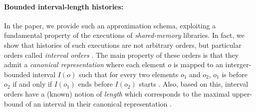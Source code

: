  

\paragraph{Bounded interval-length histories:} In the paper, we provide such an approximation schema, exploiting a fundamental property of the executions of {\em shared-memory} libraries. In fact, we show that histories of such executions are not arbitrary orders, but particular orders called {\em interval orders} \cite{}. The main property of these orders is that they admit a {\em canonical representation} where each element $o$ is mapped to an interger-bounded interval $I(o)$ such that for every two elements $o_1$ and $o_2$, $o_1$ is before $o_2$ if and only if $I(o_1)$ ends before  $I(o_2)$ starts \cite{}. 
Also, based on this, interval orders have a (known) notion of {\em length} which corresponds to the maximal upper-bound of an interval in their canonical representation \cite{}.

